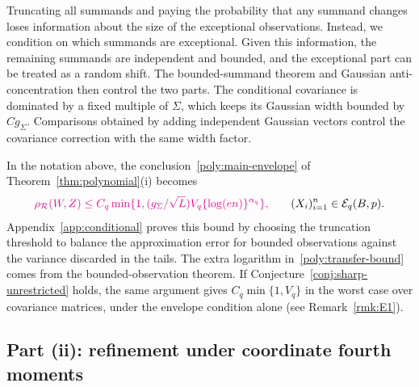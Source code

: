 \documentclass[11pt,letterpaper]{article}
\newenvironment{recovered}{}{}
\newcommand{\vSix}[1]{{\color{magenta}#1}}
\theoremstyle{remark}
\newcommand{\rh}{\rho_{\mathcal R}}
\begin{document}
Truncating all {summands} and paying the probability that any {summand} changes
loses information about the size of the exceptional observations.
Instead, we condition on which {summands} are exceptional. Given this
information, the remaining {summands} are independent and bounded, and the
exceptional part can be treated as a random shift. The bounded-summand
theorem and Gaussian anti-concentration then control the two parts.
\vSix{The conditional covariance is dominated by a fixed multiple of
\(\Sigma\), which keeps its Gaussian width bounded by \(Cg_\Sigma\).
Comparisons obtained by adding independent Gaussian vectors control
the covariance correction with the same width factor.}

\begin{recovered}
In the notation above, the conclusion~\eqref{poly:main-envelope} of
Theorem~\ref{thm:polynomial}\textup{(i)} becomes
\begin{equation}
 \vSix{\rh(W,Z)\le C_q\min\{1,(g_\Sigma/\sqrt L)
               V_q\{\log(en)\}^{\alpha_q}\},}
 \qquad (X_i)_{i=1}^n\in\mathcal E_q(B,p).
 \label{poly:transfer-bound}
\end{equation}
Appendix~\ref{app:conditional} proves this bound by choosing the
truncation threshold to balance the approximation error for bounded
observations against the variance discarded in the tails. The extra
logarithm in~\eqref{poly:transfer-bound} comes from the
bounded-observation theorem. If Conjecture~\ref{conj:sharp-unrestricted}
holds, the same argument gives \(C_q\min\{1,V_q\}\)
\vSix{in the worst case over covariance matrices}, under the
envelope condition alone {(see Remark~\ref{rmk:E1})}.
\end{recovered}

\subsection{\texorpdfstring{{Part (ii): refinement under coordinate fourth moments}}{Part (ii): refinement under coordinate fourth moments}}\label{poly:bennett-sec}
\end{document}
